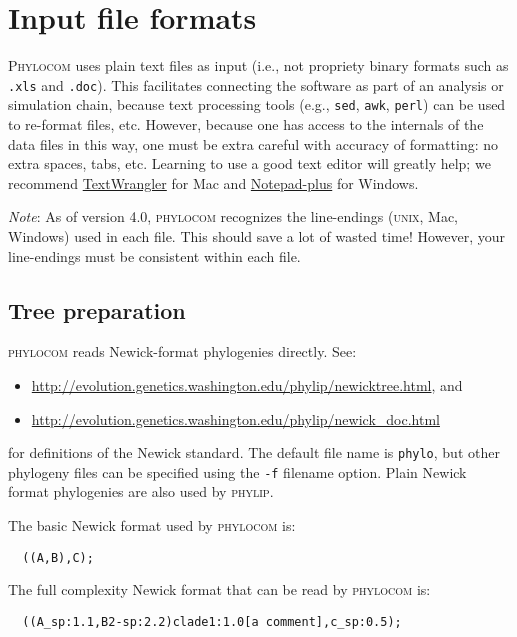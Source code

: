 \documentclass[12pt,letterpaper]{article}
\begin{document}
\section{Input file formats}

{\scshape Phylocom} uses plain text files as input (i.e., not propriety
binary formats such as \verb|.xls| and \verb|.doc|).  This facilitates
connecting the software as part of an analysis or simulation chain,
because text processing tools (e.g., \verb|sed|, \verb|awk|,
\verb|perl|) can be used to re-format files, etc.  However, because
one has access to the internals of the data files in this way, one
must be extra careful with accuracy of formatting: no extra spaces,
tabs, etc.  Learning to use a good text editor will greatly help; we
recommend
\href{http://www.barebones.com/products/textwrangler/}{TextWrangler}
for Mac and
\href{http://notepad-plus.sourceforge.net/}{Notepad-plus}
for Windows.

{\it Note}: As of version 4.0, {\scshape phylocom} recognizes the
line-endings (\textsc{unix}, Mac, Windows) used in each file.  This
should save a lot of wasted time!  However, your line-endings must be
consistent within each file.

\subsection{Tree preparation}

{\scshape phylocom} reads Newick-format phylogenies directly. See:
\begin{itemize}
\item[]
  \href{http://evolution.genetics.washington.edu/phylip/newicktree.html}{http://evolution.genetics.washington.edu/phylip/newicktree.html},
  and
\item[]
  \href{http://evolution.genetics.washington.edu/phylip/newick_doc.html}{http://evolution.genetics.washington.edu/phylip/newick\_doc.html}
\end{itemize}
for definitions of the Newick standard.  The default file name is
\verb|phylo|, but other phylogeny files can be specified using the
\verb|-f| filename option.  Plain Newick format phylogenies are also
used by {\scshape phylip}.

The basic Newick format used by {\scshape phylocom} is:
\begin{verbatim}
  ((A,B),C);
\end{verbatim}
The full complexity Newick format that can be read by {\scshape phylocom} is:
\begin{verbatim}
  ((A_sp:1.1,B2-sp:2.2)clade1:1.0[a comment],c_sp:0.5);
\end{verbatim}
\end{document}

